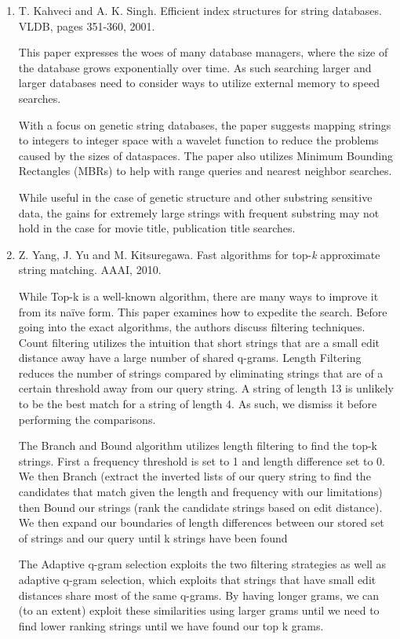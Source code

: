 \documentclass[pdftex,12pt,letter]{article}
\begin{document}
\begin{enumerate}
\item T. Kahveci and A. K. Singh. Efficient index structures for string databases. VLDB, pages 351-360, 2001.

	This paper expresses the woes of many database managers, where the size of the database grows exponentially over time. As such searching larger and larger databases need to consider ways to utilize external memory to speed searches. 

	With a focus on genetic string databases, the paper suggests mapping strings to integers to integer space with a wavelet function to reduce the problems caused by the sizes of dataspaces. The paper also utilizes Minimum Bounding Rectangles (MBRs) to help with range queries and nearest neighbor searches. 

	While useful in the case of genetic structure and other substring sensitive data, the gains for extremely large strings with frequent substring may not hold in the case for movie title, publication title searches. 


\item Z. Yang, J. Yu and M. Kitsuregawa. Fast algorithms for top-\textit{k} approximate string matching. AAAI, 2010.

	While Top-k is a well-known algorithm, there are many ways to improve it from its naïve form. This paper examines how to expedite the search. Before going into the exact algorithms, the authors discuss filtering techniques. Count filtering utilizes the intuition that short strings that are a small edit distance away have a large number of shared q-grams. Length Filtering reduces the number of strings compared by eliminating strings that are of a certain threshold away from our query string. A string of length 13 is unlikely to be the best match for a string of length 4. As such, we dismiss it before performing the comparisons. 

	The Branch and Bound algorithm utilizes length filtering to find the top-k strings. First a frequency threshold is set to 1 and length difference set to 0. We then Branch (extract the inverted lists of our query string to find the candidates that match given the length and frequency with our limitations) then Bound our strings (rank the candidate strings based on edit distance). We then expand our boundaries of length differences between our stored set of strings and our query until k strings have been found

	The Adaptive q-gram selection exploits the two filtering strategies as well as adaptive q-gram selection, which exploits that strings that have small edit distances share most of the same q-grams. By having longer grams, we can (to an extent) exploit these similarities using larger grams until we need to find lower ranking strings until we have found our top k grams. 


\end{enumerate}
\end{document}
